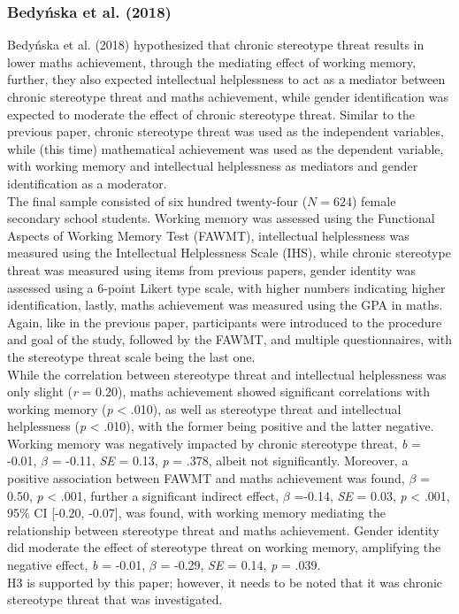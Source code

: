 \documentclass[
  stu,floatsintext]{apa7}
\begin{document}
\subsubsection{Bedyńska et al. (2018)}\label{bedynskachronicstereotypethreat2018}

Bedyńska et al. (2018) hypothesized that chronic stereotype threat results in lower maths achievement, through the mediating effect of working memory, further, they also expected intellectual helplessness to act as a mediator between chronic stereotype threat and maths achievement, while gender identification was expected to moderate the effect of chronic stereotype threat.
Similar to the previous paper, chronic stereotype threat was used as the independent variables, while (this time) mathematical achievement was used as the dependent variable, with working memory and intellectual helplessness as mediators and gender identification as a moderator.\\
The final sample consisted of six hundred twenty-four (\(N=624\)) female secondary school students.
Working memory was assessed using the Functional Aspects of Working Memory Test (FAWMT), intellectual helplessness was measured using the Intellectual Helplessness Scale (IHS), while chronic stereotype threat was measured using items from previous papers, gender identity was assessed using a 6-point Likert type scale, with higher numbers indicating higher identification, lastly, maths achievement was measured using the GPA in maths.\\
Again, like in the previous paper, participants were introduced to the procedure and goal of the study, followed by the FAWMT, and multiple questionnaires, with the stereotype threat scale being the last one.\\
While the correlation between stereotype threat and intellectual helplessness was only slight (\emph{r} = 0.20), maths achievement showed significant correlations with working memory (\emph{p} \textless{} .010), as well as stereotype threat and intellectual helplessness (\emph{p} \textless{} .010), with the former being positive and the latter negative.
Working memory was negatively impacted by chronic stereotype threat, \emph{b} = -0.01, \(\beta\) = -0.11, \emph{SE} = 0.13, \emph{p} = .378, albeit not significantly.
Moreover, a positive association between FAWMT and maths achievement was found, \(\beta\) = 0.50, \emph{p} \textless{} .001, further a significant indirect effect, \(\beta\) =-0.14, \emph{SE} = 0.03, \emph{p} \textless{} .001, 95\% CI {[}-0.20, -0.07{]}, was found, with working memory mediating the relationship between stereotype threat and maths achievement.
Gender identity did moderate the effect of stereotype threat on working memory, amplifying the negative effect, \emph{b} = -0.01, \(\beta\) = -0.29, \emph{SE} = 0.14, \emph{p} = .039.\\
H3 is supported by this paper; however, it needs to be noted that it was chronic stereotype threat that was investigated.
\end{document}
